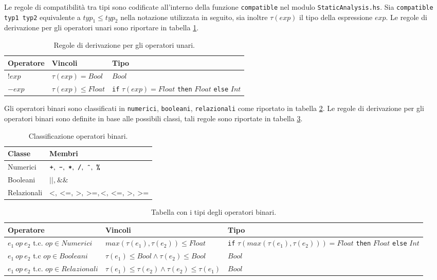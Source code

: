Le regole di compatibilità tra tipi sono codificate all'interno della funzione \texttt{compatible} nel modulo \texttt{StaticAnalysis.hs}.
Sia \texttt{compatible typ1 typ2} equivalente a $typ_1 \leq typ_2$ nella notazione utilizzata in seguito, sia inoltre $\tau(exp)$ il tipo della espressione $exp$.
Le regole di derivazione per gli operatori unari sono riportare in tabella \ref{tab:unari}.


\begin{table}[]
\begin{tabular}{l|l|l}
Operatore & Vincoli            & Tipo \\ \hline
$!exp$      & $\tau(exp) = Bool$ & $Bool$          \\
$-exp$      & $\tau(exp) \leq Float$   & \texttt{if} $\tau(exp) = Float$ \texttt{then} $Float$ \texttt{else} $Int$ \\
\end{tabular}
\caption{Regole di derivazione per gli operatori unari.}
\label{tab:unari}
\end{table}


Gli operatori binari sono classificati in \texttt{numerici}, \texttt{booleani}, \texttt{relazionali} come riportato in tabella \ref{tab:tipoOpBinari}. Le regole di derivazione per gli operatori binari sono definite in base alle possibili classi, tali regole sono riportate in tabella \ref{tab:binari}.

\begin{table}[]
\begin{tabular}{l|l}
Classe & Membri \\ \hline
Numerici & $\texttt{+},\ \texttt{-},\ \texttt{*},\ \texttt{/},\ \texttt{\^{}},\ \texttt{\%}$\\
Booleani & $\texttt{||},\ \texttt{\&\&}$ \\
Relazionali &$\texttt{<},\ \texttt{<=},\ \texttt{>},\ \texttt{>=} , \texttt{<},\ \texttt{<=},\ \texttt{>},\ \texttt{>=} $ \\
\end{tabular}
\caption{Classificazione operatori binari.}
\label{tab:tipoOpBinari}
\end{table}

\begin{table}[]
\begin{tabular}{l|l|l}
Operatore         &         Vincoli            & Tipo \\ \hline
$e_1\ op\ e_2$ t.c. $op \in Numerici$  &  $max(\tau(e_1), \tau(e_2)) \leq Float$ &  \texttt{if} $\tau(max(\tau(e_1), \tau(e_2))) = Float$ \texttt{then} $Float$ \texttt{else} $Int$ \\
$e_1\ op\ e_2$ t.c $op \in Booleani$ & $\tau(e_1) \leq Bool \wedge \tau(e_2) \leq Bool$ & $Bool$ \\
$e_1\ op\ e_2$ t.c. $op \in Relazionali$ & $\tau(e_1) \leq \tau(e_2) \wedge \tau(e_2) \leq \tau(e_1)$ & $Bool$\\
\end{tabular}
\caption{Tabella con i tipi degli operatori binari.}
\label{tab:binari}
\end{table}

